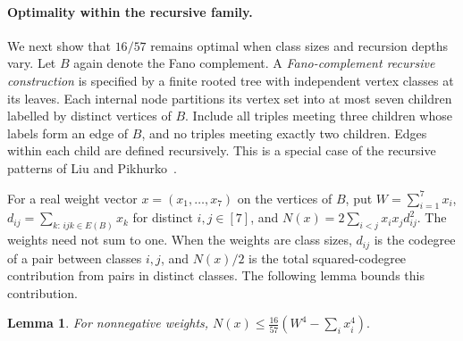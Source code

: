 \documentclass[11pt]{article}
\newtheorem{lemma}[theorem]{Lemma}
\theoremstyle{remark}
\numberwithin{equation}{section}
\begin{document}
\paragraph{Optimality within the recursive family.}
We next show that $16/57$ remains optimal when class sizes and
recursion depths vary. Let $B$ again denote the Fano complement.
A \emph{Fano-complement recursive construction} is specified by a
finite rooted tree with independent vertex classes at its leaves.
Each internal node partitions its vertex set into at most seven
children labelled by distinct vertices of $B$. Include all triples
meeting three children whose labels form an edge of $B$, and no triples
meeting exactly two children. Edges within each child are defined
recursively. This is a special case of the recursive patterns
of Liu and Pikhurko~\cite[Definition~1.1]{LP}.

For a real weight vector $x=(x_1,\ldots,x_7)$ on the vertices of $B$, put
$W=\sum_{i=1}^7 x_i$, $d_{ij}=\sum_{k:\,ijk\in E(B)}x_k$ for distinct
$i,j\in[7]$, and
$N(x)=2\sum_{i<j}x_ix_jd_{ij}^2$.
The weights need not sum to one.
When the weights are class sizes, $d_{ij}$ is the codegree of a pair
between classes $i,j$, and $N(x)/2$ is the total squared-codegree
contribution from pairs in distinct classes.
The following lemma bounds this contribution.

\begin{lemma}\label{lem:fano-weight-sos}
For nonnegative weights,
\(
 N(x)\le\frac{16}{57}\left(W^4-\sum_i x_i^4\right).
\)
\end{lemma}
\end{document}
